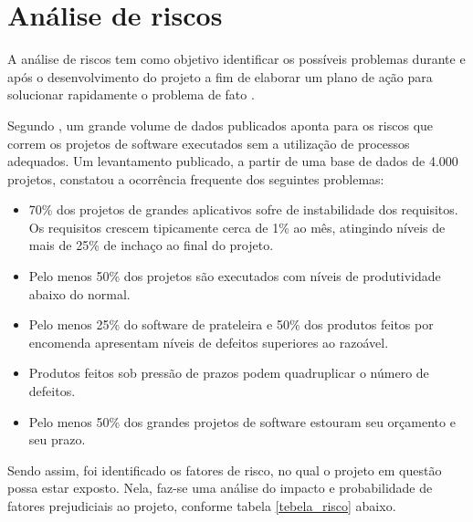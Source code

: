 {\section{Análise de riscos}
	
	A análise de riscos tem como objetivo identificar os possíveis problemas durante e após o desenvolvimento do projeto a fim de elaborar um plano de ação para solucionar rapidamente o problema de fato \cite{schmitzanalise}.
	
	Segundo \cite{de2003engenharia}, um grande volume de dados publicados aponta para os riscos que correm os projetos de software executados sem a utilização de processos adequados. Um levantamento publicado, a partir de
	uma base de dados de 4.000 projetos, constatou a ocorrência frequente dos seguintes
	problemas: 
	
	\begin{itemize}
		
		\item 70\% dos projetos de grandes aplicativos sofre de instabilidade dos requisitos. Os requisitos crescem tipicamente cerca de 1\% ao mês, atingindo níveis de mais de 25\% de inchaço ao final
		do projeto.
		
		\item Pelo menos 50\% dos projetos são executados com níveis de produtividade abaixo do normal.
		
		\item Pelo menos 25\% do software de prateleira e 50\% dos produtos feitos por encomenda apresentam níveis de defeitos superiores ao razoável. 
		
		\item Produtos feitos sob pressão de prazos podem quadruplicar o número de defeitos.
		
		\item Pelo menos 50\% dos grandes projetos de software estouram seu orçamento e seu prazo. 
		
	\end{itemize}
	
	
	Sendo assim, foi identificado os fatores de risco, no qual o projeto em questão possa estar exposto. Nela, faz-se uma análise do impacto e probabilidade de fatores prejudiciais ao projeto, conforme tabela \ref{tebela_risco} abaixo.
	
}
